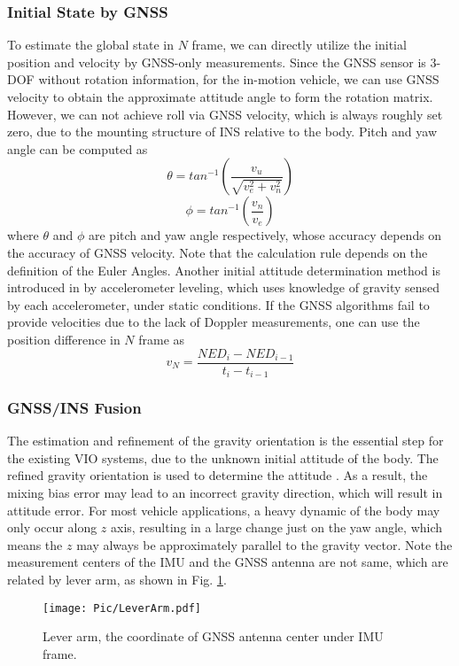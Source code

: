 \documentclass[journal,article,submit,moreauthors,pdftex]{Definitions/mdpi}
\begin{document}
\subsubsection{Initial State by GNSS}
To estimate the global state in $N$ frame, we can directly utilize the 
initial position and velocity  by GNSS-only measurements. 
Since the GNSS sensor is 3-DOF without rotation information, for the 
in-motion vehicle, we can use GNSS velocity to obtain the approximate 
attitude angle to form the rotation matrix. 
However, we can not achieve roll via GNSS velocity, which is always 
roughly set zero, due to the mounting structure of INS relative to the 
body.
Pitch and yaw angle can be computed as 
\begin{equation}
	\theta = tan^{-1} \left( \frac{v_u}{\sqrt{v_e^2+v_n^2}} \right)
\end{equation}
\begin{equation}
	\phi = tan^{-1} \left( \frac{v_n}{v_e} \right)
\end{equation}
where $\theta$ and $\phi$ are pitch and yaw angle respectively, whose 
accuracy depends on the accuracy of GNSS velocity. 
Note that the calculation rule depends on the definition of the Euler 
Angles.
Another initial attitude determination method is introduced in 
\cite{Godha2006PerformanceEO} by accelerometer leveling, which uses 
knowledge of gravity sensed by each accelerometer, under static 
conditions. 
If the GNSS algorithms fail to provide velocities due to the lack of 
Doppler measurements, one can use the position difference in $N$ frame 
as 
\begin{equation}
	v_N = \frac{NED_i-NED_{i-1}}{t_i-t_{i-1}}
\end{equation}

\subsubsection{GNSS/INS Fusion}
The estimation and refinement of the gravity orientation is the essential 
step for the existing VIO systems, due to the unknown initial attitude of 
the body. 
The refined gravity orientation is used to determine the attitude
\cite{qinRobustInitializationMonocular2017}. 
As a result, the mixing bias error may lead to an incorrect gravity 
direction, which will result in attitude error. 
For most vehicle applications, a heavy dynamic of the body may only 
occur along $z$ axis, resulting in a large change just on the yaw angle, 
which means the $z$ may always be approximately parallel to the gravity 
vector. 
Note the measurement centers of the IMU and the GNSS antenna are not same, 
which are related by lever arm, as shown in Fig. \ref{LeverArm}.
\begin{figure}[H]
	\centering
	\texttt{[image: Pic/LeverArm.pdf]}
	\caption{ Lever arm, the coordinate of GNSS antenna center under IMU frame.}
	\label{LeverArm}
\end{figure}
\end{document}
